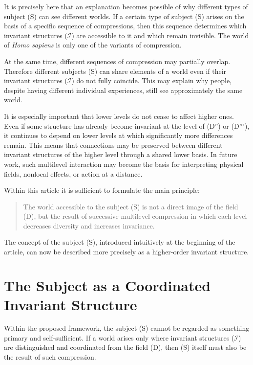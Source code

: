 \documentclass[aps,prd,onecolumn,nofootinbib,superscriptaddress]{revtex4-2}
\begin{document}
It is precisely here that an explanation becomes possible of why different types of subject (S) can see different worlds. If a certain type of subject (S) arises on the basis of a specific sequence of compressions, then this sequence determines which invariant structures ($\mathcal{I}$) are accessible to it and which remain invisible. The world of \emph{Homo sapiens} is only one of the variants of compression.

At the same time, different sequences of compression may partially overlap. Therefore different subjects (S) can share elements of a world even if their invariant structures ($\mathcal{I}$) do not fully coincide. This may explain why people, despite having different individual experiences, still see approximately the same world.

It is especially important that lower levels do not cease to affect higher ones. Even if some structure has already become invariant at the level of (D'') or (D'''), it continues to depend on lower levels at which significantly more differences remain. This means that connections may be preserved between different invariant structures of the higher level through a shared lower basis. In future work, such multilevel interaction may become the basis for interpreting physical fields, nonlocal effects, or action at a distance.

Within this article it is sufficient to formulate the main principle:

\begin{quote}
The world accessible to the subject (S) is not a direct image of the field (D), but the result of successive multilevel compression in which each level decreases diversity and increases invariance.
\end{quote}

The concept of the subject (S), introduced intuitively at the beginning of the article, can now be described more precisely as a higher-order invariant structure.

\section{The Subject as a Coordinated Invariant Structure}
Within the proposed framework, the subject (S) cannot be regarded as something primary and self-sufficient. If a world arises only where invariant structures ($\mathcal{I}$) are distinguished and coordinated from the field (D), then (S) itself must also be the result of such compression.
\end{document}
